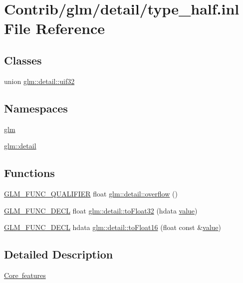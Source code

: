 \hypertarget{type__half_8inl}{}\section{Contrib/glm/detail/type\+\_\+half.inl File Reference}
\label{type__half_8inl}
\subsection*{Classes}
\begin{DoxyCompactItemize}
\item 
union \mbox{\hyperlink{unionglm_1_1detail_1_1uif32}{glm\+::detail\+::uif32}}
\end{DoxyCompactItemize}
\subsection*{Namespaces}
\begin{DoxyCompactItemize}
\item 
 \mbox{\hyperlink{namespaceglm}{glm}}
\item 
 \mbox{\hyperlink{namespaceglm_1_1detail}{glm\+::detail}}
\end{DoxyCompactItemize}
\subsection*{Functions}
\begin{DoxyCompactItemize}
\item 
\mbox{\hyperlink{setup_8hpp_a33fdea6f91c5f834105f7415e2a64407}{G\+L\+M\+\_\+\+F\+U\+N\+C\+\_\+\+Q\+U\+A\+L\+I\+F\+I\+ER}} float \mbox{\hyperlink{namespaceglm_1_1detail_a61efe122333bc00e81c57e0927bfdfb3}{glm\+::detail\+::overflow}} ()
\item 
\mbox{\hyperlink{setup_8hpp_ab2d052de21a70539923e9bcbf6e83a51}{G\+L\+M\+\_\+\+F\+U\+N\+C\+\_\+\+D\+E\+CL}} float \mbox{\hyperlink{namespaceglm_1_1detail_a8e4719d94d99ee1e625496e04317272b}{glm\+::detail\+::to\+Float32}} (hdata \mbox{\hyperlink{_s_d_l__opengl__glext_8h_a8ad81492d410ff2ac11f754f4042150f}{value}})
\item 
\mbox{\hyperlink{setup_8hpp_ab2d052de21a70539923e9bcbf6e83a51}{G\+L\+M\+\_\+\+F\+U\+N\+C\+\_\+\+D\+E\+CL}} hdata \mbox{\hyperlink{namespaceglm_1_1detail_ac16321696a34b41c55f941b319d50652}{glm\+::detail\+::to\+Float16}} (float const \&\mbox{\hyperlink{_s_d_l__opengl__glext_8h_a8ad81492d410ff2ac11f754f4042150f}{value}})
\end{DoxyCompactItemize}


\subsection{Detailed Description}
\mbox{\hyperlink{group__core}{Core features}} 